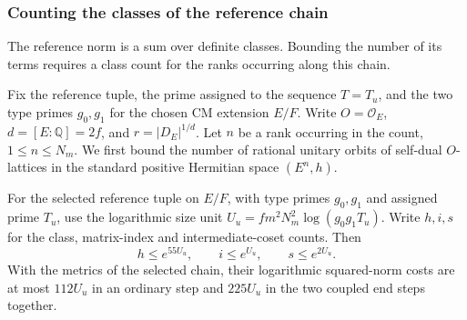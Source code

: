 \subsubsection{Counting the classes of the reference chain}
\label{subsec:selected-class-counts}
\hypertarget{source-selected-class-counts}{}

The reference norm is a sum over definite classes. Bounding the number of its terms requires a class count for the ranks occurring along this chain.

Fix the reference tuple, the prime assigned to the sequence \(T=T_u\), and the two
type primes \(g_0,g_1\) for the chosen CM extension \(E/F\). Write
\(O=\mathcal O_E\), \(d=[E:\mathbb Q]=2f\), and
\(r=|D_E|^{1/d}\). Let \(n\) be a rank occurring in the count,
\(1\le n\le N_m\). We first bound the number of rational unitary
orbits of self-dual \(O\)-lattices in the standard positive Hermitian
space \((E^n,h)\).
\label{cor:selected-class-counts-1}

\begin{proposition}\label{prop:reference-class-data}
For the selected reference tuple on \(E/F\), with type primes
\(g_0,g_1\) and assigned prime \(T_u\),
use the logarithmic size unit \(U_u=fm^2N_m^2\log(g_0g_1T_u)\).
Write \(h,i,s\) for the class, matrix-index and intermediate-coset counts. Then
\[
 h\le e^{55U_u},\qquad i\le e^{U_u},\qquad s\le e^{2U_u}.
\]
 With the
metrics of the selected chain, their logarithmic squared-norm
costs are at most \(112U_u\) in an ordinary step and
\(225U_u\) in the two coupled end steps together.
\end{proposition}

